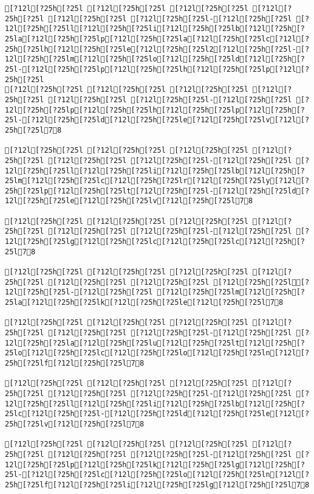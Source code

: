 \documentclass{scrartcl}
\begin{document}
\begin{Verbatim}
[?12l[?25h[?25l [?12l[?25h[?25l [?12l[?25h[?25l [?12l[?25h[?25l [?12l[?25h[?25l [?12l[?25h[?25l-[?12l[?25h[?25l [?12l[?25h[?25ll[?12l[?25h[?25li[?12l[?25h[?25lb[?12l[?25h[?25la[?12l[?25h[?25lp[?12l[?25h[?25la[?12l[?25h[?25lc[?12l[?25h[?25lh[?12l[?25h[?25le[?12l[?25h[?25l2[?12l[?25h[?25l-[?12l[?25h[?25lm[?12l[?25h[?25lo[?12l[?25h[?25ld[?12l[?25h[?25l-[?12l[?25h[?25lp[?12l[?25h[?25lh[?12l[?25h[?25lp[?12l[?25h[?25l
[?12l[?25h[?25l [?12l[?25h[?25l [?12l[?25h[?25l [?12l[?25h[?25l [?12l[?25h[?25l [?12l[?25h[?25l-[?12l[?25h[?25l [?12l[?25h[?25lp[?12l[?25h[?25lh[?12l[?25h[?25lp[?12l[?25h[?25l-[?12l[?25h[?25ld[?12l[?25h[?25le[?12l[?25h[?25lv[?12l[?25h[?25l78

[?12l[?25h[?25l [?12l[?25h[?25l [?12l[?25h[?25l [?12l[?25h[?25l [?12l[?25h[?25l [?12l[?25h[?25l-[?12l[?25h[?25l [?12l[?25h[?25ll[?12l[?25h[?25li[?12l[?25h[?25lb[?12l[?25h[?25lm[?12l[?25h[?25lc[?12l[?25h[?25lr[?12l[?25h[?25ly[?12l[?25h[?25lp[?12l[?25h[?25lt[?12l[?25h[?25l-[?12l[?25h[?25ld[?12l[?25h[?25le[?12l[?25h[?25lv[?12l[?25h[?25l78

[?12l[?25h[?25l [?12l[?25h[?25l [?12l[?25h[?25l [?12l[?25h[?25l [?12l[?25h[?25l [?12l[?25h[?25l-[?12l[?25h[?25l [?12l[?25h[?25lg[?12l[?25h[?25lc[?12l[?25h[?25lc[?12l[?25h[?25l78

[?12l[?25h[?25l [?12l[?25h[?25l [?12l[?25h[?25l [?12l[?25h[?25l [?12l[?25h[?25l [?12l[?25h[?25l [?12l[?25h[?25l[?12l[?25h[?25l-[?12l[?25h[?25l [?12l[?25h[?25lm[?12l[?25h[?25la[?12l[?25h[?25lk[?12l[?25h[?25le[?12l[?25h[?25l78

[?12l[?25h[?25l [?12l[?25h[?25l [?12l[?25h[?25l [?12l[?25h[?25l [?12l[?25h[?25l [?12l[?25h[?25l-[?12l[?25h[?25l [?12l[?25h[?25la[?12l[?25h[?25lu[?12l[?25h[?25lt[?12l[?25h[?25lo[?12l[?25h[?25lc[?12l[?25h[?25lo[?12l[?25h[?25ln[?12l[?25h[?25lf[?12l[?25h[?25l78

[?12l[?25h[?25l [?12l[?25h[?25l [?12l[?25h[?25l [?12l[?25h[?25l [?12l[?25h[?25l [?12l[?25h[?25l-[?12l[?25h[?25l [?12l[?25h[?25ll[?12l[?25h[?25li[?12l[?25h[?25lb[?12l[?25h[?25lc[?12l[?25h[?25l-[?12l[?25h[?25ld[?12l[?25h[?25le[?12l[?25h[?25lv[?12l[?25h[?25l78

[?12l[?25h[?25l [?12l[?25h[?25l [?12l[?25h[?25l [?12l[?25h[?25l [?12l[?25h[?25l [?12l[?25h[?25l-[?12l[?25h[?25l [?12l[?25h[?25lp[?12l[?25h[?25lk[?12l[?25h[?25lg[?12l[?25h[?25l-[?12l[?25h[?25lc[?12l[?25h[?25lo[?12l[?25h[?25ln[?12l[?25h[?25lf[?12l[?25h[?25li[?12l[?25h[?25lg[?12l[?25h[?25l78


\end{Verbatim}
\end{document}
